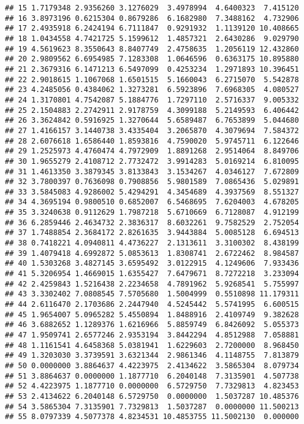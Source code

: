 \documentclass[
]{article}
\begin{document}
\begin{verbatim}
## 15 1.7179348 2.9356260 3.1276029  3.4978994  4.6400323  7.415120
## 16 3.8973196 0.6215304 0.8679286  6.1682980  7.3488162  4.732906
## 17 2.4935918 6.2424194 6.7111847  0.9291932  1.1139120 10.408665
## 18 1.0434558 4.7421725 5.1599612  1.4857321  2.6430286  9.029790
## 19 4.5619623 8.3550643 8.8407749  2.4758635  1.2056119 12.432860
## 20 2.9809562 6.6954985 7.1283308  1.0646596  0.6363175 10.895880
## 21 2.3679316 6.1471213 6.5497099  0.4253234  1.2971893 10.396451
## 22 2.9018615 1.1067068 1.6501515  5.1660043  6.2715070  5.542878
## 23 4.2485056 0.4384062 1.3273281  6.5923896  7.6968305  4.080527
## 24 1.3170801 4.7542087 5.1884776  1.7297110  2.5716337  9.005332
## 25 2.1504883 2.2742911 2.9178759  4.3099188  5.2149593  6.406442
## 26 3.3624842 0.5916925 1.3270644  5.6589487  6.7653899  5.044680
## 27 1.4166157 3.1440738 3.4335404  3.2065870  4.3079694  7.584372
## 28 2.6076618 1.6586440 1.8593816  4.7590020  5.9745711  6.122646
## 29 1.2525973 4.4760474 4.7972909  1.8891268  2.9514064  8.849706
## 30 1.9655279 2.4108712 2.7732472  3.9914283  5.0169214  6.810095
## 31 1.4613350 3.3879345 3.8133843  3.1534267  4.0346127  7.672809
## 32 3.7800397 0.7636098 0.7908856  5.9801589  7.0865436  5.029891
## 33 3.5845083 4.9286002 5.4294291  4.3454689  4.3937569  8.551327
## 34 4.3695194 0.9800510 0.6852007  6.5468695  7.6204003  4.678205
## 35 3.3240638 0.9112629 1.7987218  5.6710669  6.7128087  4.912199
## 36 6.2859446 2.4634732 2.3836317  8.6032261  9.7582529  2.752054
## 37 1.7488854 2.3684172 2.8261635  3.9443884  5.0085128  6.694513
## 38 0.7418221 4.0940811 4.4736227  2.1313611  3.3100302  8.438199
## 39 1.4079418 4.6992872 5.0853613  1.8308741  2.6722462  8.984587
## 40 1.5303268 3.4827145 3.6595492  3.0122915  4.1249606  7.933436
## 41 5.3206954 1.4669015 1.6355427  7.6479671  8.7272218  3.233094
## 42 2.4259843 1.5216438 2.2234658  4.7891962  5.9268541  5.755997
## 43 3.3302402 7.0808545 7.5705680  1.5004999  0.5510898 11.179311
## 44 2.6116470 2.1703686 2.2447940  4.5245442  5.5741995  6.600515
## 45 1.9654007 5.0965282 5.4550894  1.8488916  2.4109749  9.382628
## 46 3.6882652 1.1289376 1.6216966  5.8859749  6.8426092  5.055373
## 47 1.9509741 2.6577246 2.9353194  3.8442294  4.8512988  7.058881
## 48 1.1161541 4.6458368 5.0381941  1.6229603  2.7200000  8.968450
## 49 1.3203030 3.3739591 3.6321344  2.9861346  4.1148755  7.813879
## 50 0.0000000 3.8864637 4.4223975  2.4134622  3.5865304  8.079734
## 51 3.8864637 0.0000000 1.1877710  6.2040148  7.3135901  4.507738
## 52 4.4223975 1.1877710 0.0000000  6.5729750  7.7329813  4.823453
## 53 2.4134622 6.2040148 6.5729750  0.0000000  1.5037287 10.485376
## 54 3.5865304 7.3135901 7.7329813  1.5037287  0.0000000 11.500213
## 55 8.0797339 4.5077378 4.8234531 10.4853755 11.5002130  0.000000
\end{verbatim}
\end{document}
